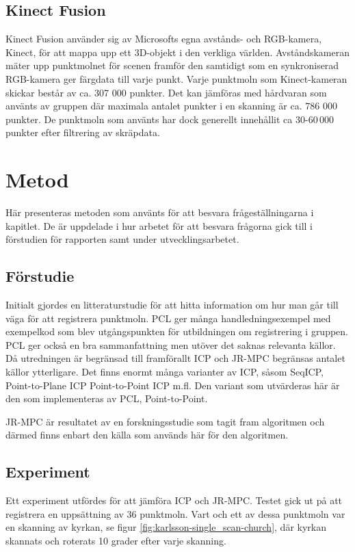 \subsection{Kinect Fusion}
\label{sec:kinect-karlsson}
Kinect Fusion använder sig av Microsofts egna avstånds- och RGB-kamera, Kinect, för att mappa upp ett 3D-objekt i den verkliga världen. Avståndskameran mäter upp punktmolnet för scenen framför den samtidigt som en synkroniserad RGB-kamera ger färgdata till varje punkt. 
Varje punktmoln som Kinect-kameran skickar består av ca. 307 000 punkter. Det kan jämföras med hårdvaran som använts av gruppen där maximala antalet punkter i en skanning är ca. 786 000 punkter. De punktmoln som använts har dock generellt innehållit ca 30-60\,000 punkter efter filtrering av skräpdata.

\section{Metod}
\label{sec:method-karlsson}

Här presenteras metoden som använts för att besvara frågeställningarna i kapitlet. De är uppdelade i hur arbetet för att besvara frågorna gick till i förstudien för rapporten samt under utvecklingsarbetet.

\subsection{Förstudie}
Initialt gjordes en litteraturstudie för att hitta information om hur man går till väga för att registrera punktmoln.  PCL ger många handledningsexempel med exempelkod som blev utgångspunkten för utbildningen om registrering i gruppen. PCL ger också en bra sammanfattning men utöver det saknas relevanta källor. Då utredningen är begränsad till framförallt ICP och JR-MPC begränsas antalet källor ytterligare. Det finns enormt många varianter av ICP, såsom SeqICP, Point-to-Plane ICP Point-to-Point ICP m.fl. Den variant som utvärderas här är den som implementeras av PCL, Point-to-Point. 

JR-MPC är resultatet av en forskningsstudie som tagit fram algoritmen och därmed finns enbart den källa som används här för den algoritmen. 

\subsection{Experiment}
Ett experiment utfördes för att jämföra ICP och JR-MPC. Testet gick ut på att registrera en uppsättning av 36 punktmoln. Vart och ett av dessa punktmoln var en skanning av kyrkan, se figur \ref{fig:karlsson-single_scan-church}, där kyrkan skannats och roterats 10 grader efter varje skanning. 

